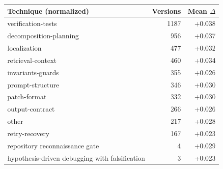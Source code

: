 \begin{tabular}{lrr}
\toprule
Technique (normalized) & Versions & Mean $\Delta$ \\
\midrule
verification-tests & 1187 & +0.038 \\
decomposition-planning & 956 & +0.037 \\
localization & 477 & +0.032 \\
retrieval-context & 460 & +0.034 \\
invariants-guards & 355 & +0.026 \\
prompt-structure & 346 & +0.030 \\
patch-format & 332 & +0.030 \\
output-contract & 266 & +0.026 \\
other & 217 & +0.028 \\
retry-recovery & 167 & +0.023 \\
repository reconnaissance gate & 4 & +0.029 \\
hypothesis-driven debugging with falsification & 3 & +0.023 \\
\bottomrule
\end{tabular}
